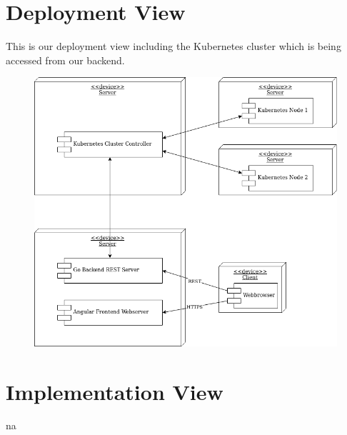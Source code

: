 \documentclass[a4paper,12pt,chapterprefix=false,bibliography=totoc,listof=totoc,]{scrreprt}
\begin{document}
\chapter{Deployment View}
This is our deployment view including the Kubernetes cluster which is being accessed from our backend.
\begin{figure}
	\includegraphics[width=\textwidth]{diagramms/DeploymentView.png}
	\label{fig:ucd}
\end{figure}

\chapter{Implementation View}
\gls{na}

\end{document}
